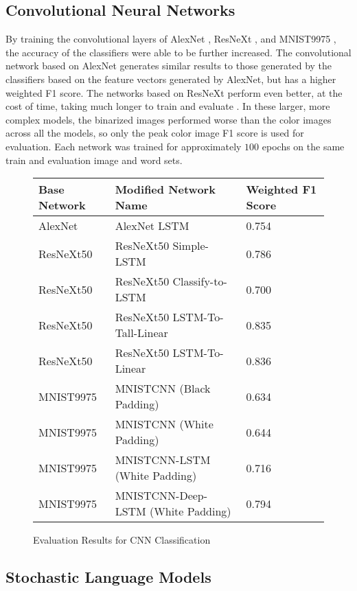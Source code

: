 \subsection{Convolutional Neural Networks}

By training the convolutional layers of AlexNet \cite{Krizhevsky}, ResNeXt \cite{Xie}, and MNIST9975 \cite{Deotte}, the accuracy of the classifiers were able to be further increased. The convolutional network based on AlexNet generates similar results to those generated by the classifiers based on the feature vectors generated by AlexNet, but has a higher weighted F1 score. The networks based on ResNeXt perform even better, at the cost of time, taking much longer to train and evaluate . In these larger, more complex models, the binarized images performed worse than the color images across all the models, so only the peak color image F1 score is used for evaluation. Each network was trained for approximately $100$ epochs on the same train and evaluation image and word sets.

\begin{figure}[H]
    \caption{Evaluation Results for CNN Classification}
    \label{fig:classificationCNN}
    \centering
    \begin{tabular}{ | l | l | l | }
        \hline
        Base Network & Modified Network Name & Weighted F1 Score \\
        \hline
        AlexNet & AlexNet LSTM & 0.754 \\
        ResNeXt50 & ResNeXt50 Simple-LSTM & 0.786 \\
        ResNeXt50 & ResNeXt50 Classify-to-LSTM & 0.700 \\
        ResNeXt50 & ResNeXt50 LSTM-To-Tall-Linear & 0.835 \\
        ResNeXt50 & ResNeXt50 LSTM-To-Linear & 0.836 \\
        MNIST9975 & MNISTCNN (Black Padding) & 0.634 \\
        MNIST9975 & MNISTCNN (White Padding) & 0.644 \\
        MNIST9975 & MNISTCNN-LSTM (White Padding) & 0.716 \\
        MNIST9975 & MNISTCNN-Deep-LSTM (White Padding) & 0.794 \\
        \hline
    \end{tabular}
\end{figure}

\subsection{Stochastic Language Models}

